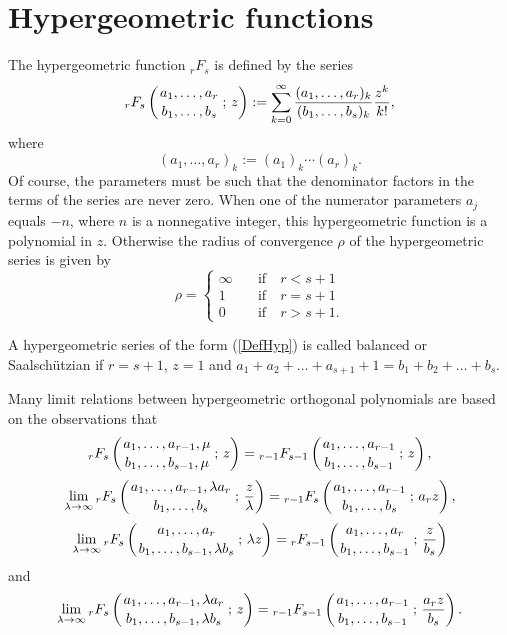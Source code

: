 \documentclass[envcountchap,graybox]{svmono}
\newcommand{\hyp}[5]{\mbox{}_{#1}{F}_{#2}
\left(\genfrac{}{}{0pt}{}{#3}{#4}\,;\,#5\right)}
\begin{document}
\section{Hypergeometric functions}
\par\setcounter{equation}{0}
\label{hypergeometric functions}

The hypergeometric function $\mbox{}_rF_s$ is defined by the series
\begin{equation}
\label{DefHyp}\index{Hypergeometric function}
\hyp{r}{s}{a_1,\ldots,a_r}{b_1,\ldots,b_s}{z}:=
\sum\limits_{k=0}^{\infty}\frac{(a_1,\ldots,a_r)_k}{(b_1,\ldots,b_s)_k}
\frac{z^k}{k!},
\end{equation}
where
$$(a_1,\ldots,a_r)_k:=(a_1)_k\cdots(a_r)_k.$$
Of course, the parameters must be such that the denominator factors in the
terms of the series are never zero. When one of the numerator parameters
$a_j$ equals $-n$, where $n$ is a nonnegative integer, this hypergeometric
function is a polynomial in $z$. Otherwise the radius of convergence $\rho$ of
the hypergeometric series is given by
$$\rho=\left\{\begin{array}{ll}
\displaystyle \infty & \quad\textrm{if}\quad r < s+1\\[5mm]
\displaystyle 1 & \quad\textrm{if}\quad r = s+1\\[5mm]
\displaystyle 0 & \quad\textrm{if}\quad r > s+1.\end{array}\right.$$

A hypergeometric series of the form (\ref{DefHyp}) is called
balanced or
Saalsch\"{u}tzian
if $r=s+1$, $z=1$ and $a_1+a_2+ \ldots +a_{s+1}+1=b_1+b_2+ \ldots +b_s$.

Many limit relations between hypergeometric orthogonal polynomials are based on the observations that
\begin{equation}
\label{hypsub}
\hyp{r}{s}{a_1,\ldots,a_{r-1},\mu}{b_1,\ldots,b_{s-1},\mu}{z}
=\hyp{r-1}{s-1}{a_1,\ldots,a_{r-1}}{b_1,\ldots,b_{s-1}}{z},
\end{equation}
\begin{equation}
\label{hyplim1}
\lim\limits_{\lambda\rightarrow\infty}
\hyp{r}{s}{a_1,\ldots,a_{r-1},\lambda a_r}{b_1,\ldots,b_s}{\frac{z}{\lambda}}
=\hyp{r-1}{s}{a_1,\ldots,a_{r-1}}{b_1,\ldots,b_s}{a_rz},
\end{equation}
\begin{equation}
\label{hyplim2}
\lim\limits_{\lambda\rightarrow\infty}
\hyp{r}{s}{a_1,\ldots,a_r}{b_1,\ldots,b_{s-1},\lambda b_s}{\lambda z}=
\hyp{r}{s-1}{a_1,\ldots,a_r}{b_1,\ldots,b_{s-1}}{\frac{z}{b_s}}
\end{equation}
and
\begin{equation}
\label{hyplim3}
\lim\limits_{\lambda\rightarrow\infty}
\hyp{r}{s}{a_1,\ldots,a_{r-1},\lambda a_r}{b_1,\ldots,b_{s-1},\lambda b_s}{z}
=\hyp{r-1}{s-1}{a_1,\ldots,a_{r-1}}{b_1,\ldots,b_{s-1}}{\frac{a_rz}{b_s}}.
\end{equation}
\end{document}
